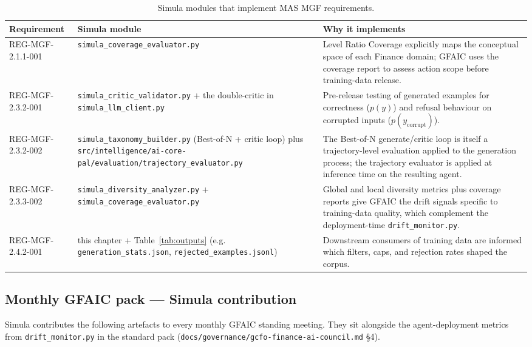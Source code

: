 \documentclass[11pt,a4paper]{article}
\begin{document}
\begin{table}[H]
\centering
\caption{Simula modules that implement MAS MGF requirements.}
\label{tab:simula-mgf-map}
\begin{tabularx}{\textwidth}{p{3cm}p{5cm}X}
\toprule
\textbf{Requirement} & \textbf{Simula module} & \textbf{Why it implements} \\
\midrule
REG-MGF-2.1.1-001 &
  \texttt{simula\_coverage\_evaluator.py} &
  Level Ratio Coverage explicitly maps the conceptual space of each
  Finance domain; GFAIC uses the coverage report to assess action
  scope before training-data release. \\
REG-MGF-2.3.2-001 &
  \texttt{simula\_critic\_validator.py} + the double-critic in
  \texttt{simula\_llm\_client.py} &
  Pre-release testing of generated examples for correctness
  ($p(y)$) and refusal behaviour on corrupted inputs
  ($p(y_{\text{corrupt}})$). \\
REG-MGF-2.3.2-002 &
  \texttt{simula\_taxonomy\_builder.py} (Best-of-N + critic loop)
  plus \texttt{src/intelligence/ai-core-pal/evaluation/trajectory\_evaluator.py} &
  The Best-of-N generate/critic loop is itself a trajectory-level
  evaluation applied to the generation process; the trajectory
  evaluator is applied at inference time on the resulting agent. \\
REG-MGF-2.3.3-002 &
  \texttt{simula\_diversity\_analyzer.py} + \texttt{simula\_coverage\_evaluator.py} &
  Global and local diversity metrics plus coverage reports give
  GFAIC the drift signals specific to training-data quality, which
  complement the deployment-time \texttt{drift\_monitor.py}. \\
REG-MGF-2.4.2-001 &
  this chapter + Table~\ref{tab:outputs} (e.g.
  \texttt{generation\_stats.json}, \texttt{rejected\_examples.jsonl}) &
  Downstream consumers of training data are informed which filters,
  caps, and rejection rates shaped the corpus. \\
\bottomrule
\end{tabularx}
\end{table}

\subsection{Monthly GFAIC pack --- Simula contribution}

Simula contributes the following artefacts to every monthly GFAIC
standing meeting. They sit alongside the agent-deployment metrics
from \texttt{drift\_monitor.py} in the standard pack
(\texttt{docs/governance/gcfo-finance-ai-council.md} \S4).
\end{document}

